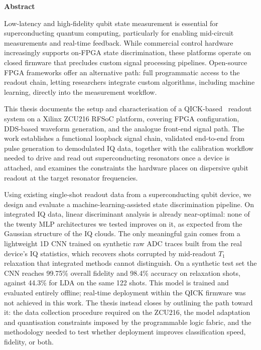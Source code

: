 \documentclass[a4paper,onecolumn,11pt,unpublished]{quantumarticle}
\newcommand{\QICK}{QICK}
\renewenvironment{abstract}
    {\small
    \begin{center}
    \bfseries Abstract
    \end{center}
    \quotation}
    {\endquotation}
\begin{document}
\begin{abstract}
    Low-latency and high-fidelity qubit state measurement is essential for superconducting quantum computing, particularly for enabling mid-circuit measurements and real-time feedback. While commercial control hardware increasingly supports on-FPGA state discrimination, these platforms operate on closed firmware that precludes custom signal processing pipelines. Open-source FPGA frameworks offer an alternative path: full programmatic access to the readout chain, letting researchers integrate custom algorithms, including machine learning, directly into the measurement workflow.

    This thesis documents the setup and characterisation of a \QICK{}-based~\cite{Stefanazzi2022} readout system on a Xilinx ZCU216 RFSoC platform, covering FPGA configuration, DDS-based waveform generation, and the analogue front-end signal path. The work establishes a functional loopback signal chain, validated end-to-end from pulse generation to demodulated IQ data, together with the calibration workflow needed to drive and read out superconducting resonators once a device is attached, and examines the constraints the hardware places on dispersive qubit readout at the target resonator frequencies.

    Using existing single-shot readout data from a superconducting qubit device, we
    design and evaluate a machine-learning-assisted state discrimination pipeline.  On
    integrated IQ data, linear discriminant analysis is already near-optimal: none of
    the twenty MLP architectures we tested improves on it, as expected from the
    Gaussian structure of the IQ clouds.  The only meaningful gain comes from a
    lightweight 1D CNN trained on synthetic raw ADC traces built from the real
    device's IQ statistics, which recovers shots corrupted by mid-readout $T_1$
    relaxation that integrated methods cannot distinguish.  On a synthetic test set the CNN reaches 99.75\% overall
    fidelity and 98.4\% accuracy on relaxation shots, against 44.3\% for LDA on the
    same 122 shots.  This model is trained and evaluated entirely offline; real-time
    deployment within the QICK firmware was not achieved in this work.  The thesis
    instead closes by outlining the path toward it: the data collection procedure
    required on the ZCU216, the model adaptation and quantisation constraints imposed
    by the programmable logic fabric, and the methodology needed to test whether
    deployment improves classification speed, fidelity, or both.

\end{abstract}
\end{document}
